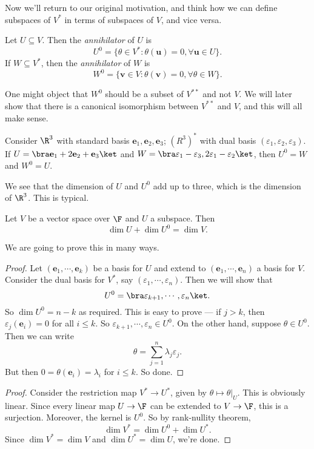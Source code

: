 \documentclass[a4paper]{article}
\begin{document}
Now we'll return to our original motivation, and think how we can define subspaces of $V^*$ in terms of subspaces of $V$, and vice versa.

\begin{defi}[Annihilator]
  Let $U\subseteq V$. Then the \emph{annihilator} of $U$ is
  \[
    U^0 = \{\theta\in V^* : \theta(\mathbf{u}) = 0, \forall \mathbf{u}\in U\}.
  \]
  If $W \subseteq V^*$, then the \emph{annihilator} of $W$ is
  \[
    W^0 = \{\mathbf{v}\in V: \theta(\mathbf{v}) = 0,\forall \theta \in W\}.
  \]
\end{defi}
One might object that $W^0$ should be a subset of $V^{**}$ and not $V$. We will later show that there is a canonical isomorphism between $V^{**}$ and $V$, and this will all make sense.

\begin{eg}
  Consider $\R^3$ with standard basis $\mathbf{e}_1, \mathbf{e}_2, \mathbf{e}_3$; $(R^3)^*$ with dual basis $(\varepsilon_1, \varepsilon_2, \varepsilon_3)$. If $U = \bra \mathbf{e}_1 + 2\mathbf{e}_2 + \mathbf{e}_3\ket$ and $W = \bra \varepsilon_1 - \varepsilon_3, 2\varepsilon_1 - \varepsilon_2\ket $, then $U^0 = W$ and $W^0 = U$.
\end{eg}
We see that the dimension of $U$ and $U^0$ add up to three, which is the dimension of $\R^3$. This is typical.

\begin{prop}
  Let $V$ be a vector space over $\F$ and $U$ a subspace. Then
  \[
    \dim U + \dim U^0 = \dim V.
  \]
\end{prop}
We are going to prove this in many ways.
\begin{proof}
  Let $(\mathbf{e}_1, \cdots, \mathbf{e}_k)$ be a basis for $U$ and extend to $(\mathbf{e}_1, \cdots, \mathbf{e}_n)$ a basis for $V$. Consider the dual basis for $V^*$, say $(\varepsilon_1, \cdots, \varepsilon_n)$. Then we will show that
  \[
    U^0 = \bra \varepsilon_{k + 1}, \cdots, \varepsilon_{n}\ket.
  \]
  So $\dim U^0 = n - k$ as required. This is easy to prove --- if $j > k$, then $\varepsilon_j(\mathbf{e}_i) = 0$ for all $ i \leq k$. So $\varepsilon_{k + 1}, \cdots, \varepsilon_n \in U^0$. On the other hand, suppose $\theta \in U^0$. Then we can write
  \[
    \theta = \sum_{j = 1}^n \lambda_j \varepsilon_j.
  \]
  But then $0 = \theta (\mathbf{e}_i) = \lambda_i$ for $i \leq k$. So done.
\end{proof}

\begin{proof}
  Consider the restriction map $V^* \to U^*$, given by $\theta \mapsto \theta|_U$. This is obviously linear. Since every linear map $U \to \F$ can be extended to $V\to \F$, this is a surjection. Moreover, the kernel is $U^0$. So by rank-nullity theorem,
  \[
    \dim V^* = \dim U^0 + \dim U^*.
  \]
  Since $\dim V^* = \dim V$ and $\dim U^* = \dim U$, we're done.
\end{proof}
\end{document}
